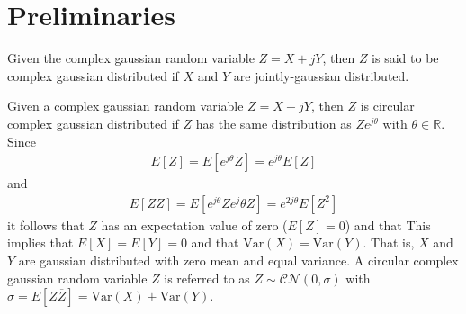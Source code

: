 \documentclass[a4paper, openany, oneside]{memoir}
\begin{document}
\section{Preliminaries}


\begin{blockDefinition}
Given the complex gaussian random variable $Z = X + jY$, then $Z$ is said to be complex gaussian distributed if $X$ and $Y$ are jointly-gaussian distributed.
\end{blockDefinition}

\begin{blockDefinition}
Given a complex gaussian random variable $Z = X + jY$, then $Z$ is circular complex gaussian distributed if $Z$ has the same distribution as $Ze^{j\theta}$ with $\theta \in \mathbb{R}$. Since
\begin{align*}
	E\left[Z\right] = E\left[e^{j\theta}Z\right]  = e^{j\theta}E\left[Z\right] 
\end{align*}
and
\begin{align*}
	E\left[ZZ\right] = E\left[e^{j\theta}Z e^j\theta{Z}\right]  = e^{2j\theta}E\left[Z^2\right] 
\end{align*}
it follows that $Z$  has an expectation value of zero ($E\left[Z\right] = 0$) and that %
This implies that $E\left[X\right] = E\left[Y\right] = 0$ and that $\text{Var}\left(X\right) = \text{Var}\left(Y\right)$. That is, $X$ and $Y$ are gaussian distributed
with zero mean and equal variance. 
A circular complex gaussian random variable $Z$ is referred to as $Z \sim \mathcal{CN}(0,\sigma)$ with $\sigma= E\left[Z\overline{Z}\right] = \text{Var}\left(X\right) + \text{Var}\left(Y\right)$. 
\end{blockDefinition}
\end{document}
